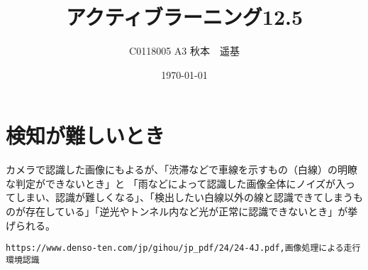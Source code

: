 \documentclass[uplatex]{jsarticle} %
\title{アクティブラーニング12.5}
\author{C0118005 A3 秋本　遥基}
\date{\today}
\begin{document}
\maketitle

\section{検知が難しいとき}

  カメラで認識した画像にもよるが、「渋滞などで車線を示すもの（白線）の明瞭な判定ができないとき」と
  「雨などによって認識した画像全体にノイズが入ってしまい、認識が難しくなる」、「検出したい白線以外の線と認識できてしまうものが存在している」「逆光やトンネル内など光が正常に認識できないとき」が挙げられる。

\begin{thebibliography}{9}
   \verb+https://www.denso-ten.com/jp/gihou/jp_pdf/24/24-4J.pdf,画像処理による走行環境認識+
\end{thebibliography}
\end{document}
